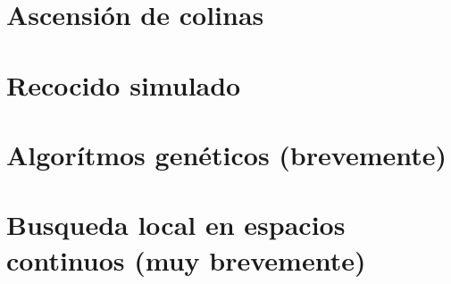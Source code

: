     
    \section{Ascensión de colinas}%
    
    \section{Recocido simulado}%
    
    \section{Algorítmos genéticos (brevemente)}%

    \section{Busqueda local en espacios continuos (muy brevemente)}%
    